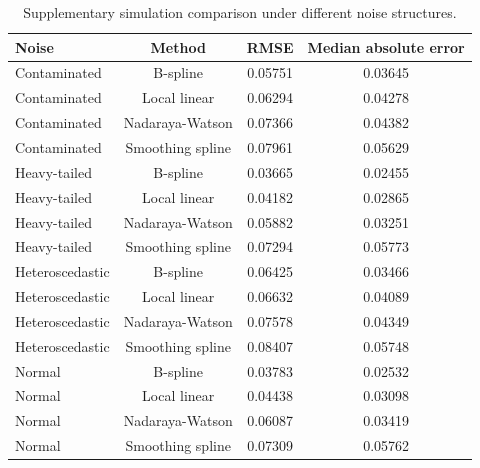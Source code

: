 \begin{table}[H]
\centering
\caption{Supplementary simulation comparison under different noise structures.}
\label{tab:noise-comparison-full}
\small
\begin{tabular}{lccc}
\toprule
Noise & Method & RMSE & Median absolute error \\
\midrule
Contaminated & B-spline & 0.05751 & 0.03645 \\
Contaminated & Local linear & 0.06294 & 0.04278 \\
Contaminated & Nadaraya-Watson & 0.07366 & 0.04382 \\
Contaminated & Smoothing spline & 0.07961 & 0.05629 \\
Heavy-tailed & B-spline & 0.03665 & 0.02455 \\
Heavy-tailed & Local linear & 0.04182 & 0.02865 \\
Heavy-tailed & Nadaraya-Watson & 0.05882 & 0.03251 \\
Heavy-tailed & Smoothing spline & 0.07294 & 0.05773 \\
Heteroscedastic & B-spline & 0.06425 & 0.03466 \\
Heteroscedastic & Local linear & 0.06632 & 0.04089 \\
Heteroscedastic & Nadaraya-Watson & 0.07578 & 0.04349 \\
Heteroscedastic & Smoothing spline & 0.08407 & 0.05748 \\
Normal & B-spline & 0.03783 & 0.02532 \\
Normal & Local linear & 0.04438 & 0.03098 \\
Normal & Nadaraya-Watson & 0.06087 & 0.03419 \\
Normal & Smoothing spline & 0.07309 & 0.05762 \\
\bottomrule
\end{tabular}
\end{table}
